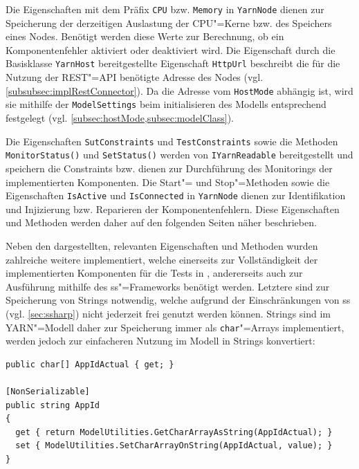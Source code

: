 Die Eigenschaften mit dem Präfix \texttt{CPU} bzw. \texttt{Memory} in \texttt{YarnNode} dienen zur Speicherung der derzeitigen Auslastung der CPU"=Kerne bzw. des Speichers eines Nodes.
Benötigt werden diese Werte zur Berechnung, ob ein Komponentenfehler aktiviert oder deaktiviert wird.
Die Eigenschaft durch die Basisklasse \texttt{YarnHost} bereitgestellte Eigenschaft \texttt{HttpUrl} beschreibt die für die Nutzung der REST"=API benötigte Adresse des Nodes (vgl. \cref{subsubsec:implRestConnector}).
Da die Adresse vom \texttt{HostMode} abhängig ist, wird sie mithilfe der \texttt{ModelSettings} beim initialisieren des Modells entsprechend festgelegt (vgl. \cref{subsec:hostMode,subsec:modelClass}).

Die Eigenschaften \texttt{SutConstraints} und \texttt{TestConstraints} sowie die Methoden \texttt{MonitorStatus()} und \texttt{SetStatus()} werden von \texttt{IYarnReadable} bereitgestellt und speichern die Constraints bzw. dienen zur Durchführung des Monitorings der implementierten Komponenten.
Die Start"= und Stop"=Methoden sowie die Eigenschaften \texttt{IsActive} und \texttt{IsConnected} in \texttt{YarnNode} dienen zur Identifikation und Injizierung bzw. Reparieren der Komponentenfehlern.
Diese Eigenschaften und Methoden werden daher auf den folgenden Seiten näher beschrieben.

Neben den dargestellten, relevanten Eigenschaften und Methoden wurden zahlreiche weitere implementiert, welche einerseits zur Vollständigkeit der implementierten Komponenten für die Tests in \cite{Eberhardinger2018}, andererseits auch zur Ausführung mithilfe des \ac{ss}"=Frameworks benötigt werden.
Letztere sind \zB zur Speicherung von Strings notwendig, welche aufgrund der Einschränkungen von \ac{ss} (vgl. \cref{sec:ssharp}) nicht jederzeit frei genutzt werden können.
Strings sind im \ac{YARN}"=Modell daher zur Speicherung immer als  \texttt{char}"=Arrays implementiert, werden jedoch zur einfacheren Nutzung im Modell in Strings konvertiert:

\begin{lstlisting}[label=lst:modelCharArrayAsString,style=cs,
caption={[Implementierung der Eigenschaft AppId]
    Implementierung der Eigenschaft \texttt{AppId}.
    Die beiden Methoden \texttt{GetCharArrayAsString} und \texttt{SetCharArrayOnString} führen die Konvertierung in den \texttt{char}"=Array bzw. des \texttt{char}"=Arrays in einen String durch.}]
public char[] AppIdActual { get; }

[NonSerializable]
public string AppId
{
  get { return ModelUtilities.GetCharArrayAsString(AppIdActual); }
  set { ModelUtilities.SetCharArrayOnString(AppIdActual, value); }
}
\end{lstlisting}


